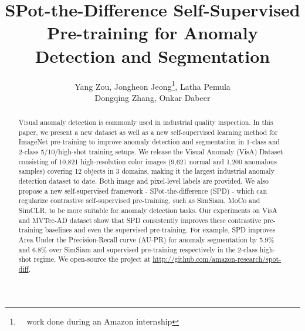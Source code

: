\documentclass[runningheads]{llncs}
\newcommand{\Dongqing}[1]{\textcolor{cyan}{\textbf{[Dongqing: #1]}}}
\begin{document}
\pagestyle{headings}
\mainmatter
\def\ECCVSubNumber{2149}  

\title{SPot-the-Difference Self-Supervised Pre-training for Anomaly Detection and Segmentation}

\author{Yang Zou, Jongheon Jeong\thanks{~~work done during an Amazon internship}, Latha Pemula \\Dongqing Zhang, Onkar Dabeer}
\maketitle

\begin{abstract}
 Visual anomaly detection is commonly used in industrial quality inspection. In this paper, we present a new dataset as well as a new self-supervised learning method for ImageNet pre-training to improve anomaly detection and segmentation in 1-class and 2-class 5/10/high-shot training setups. We release the Visual Anomaly (VisA) Dataset consisting of 10,821 high-resolution color images (9,621 normal and 1,200 anomalous samples) covering 12 objects in 3 domains, making it the largest industrial anomaly detection dataset to date. Both image and pixel-level labels are provided. We also propose a new self-supervised framework - SPot-the-difference (SPD) - which can regularize contrastive self-supervised pre-training, such as SimSiam, MoCo and SimCLR, to be more suitable for anomaly detection tasks. Our experiments on VisA and MVTec-AD dataset show that SPD consistently improves these contrastive pre-training baselines and even the supervised pre-training. For example, SPD improves Area Under the Precision-Recall curve (AU-PR) for anomaly segmentation by 5.9\% and 6.8\% over SimSiam and supervised pre-training respectively in the 2-class high-shot regime.
 We open-source the project at \url{http://github.com/amazon-research/spot-diff}.

\end{abstract}
\end{document}
